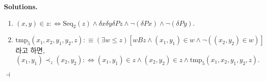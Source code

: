 \documentclass[12pt]{paper}
\newenvironment{context}[1][]
{ \noindent \textbf{{#1}.} }
{ \hfill $ \dashv $ }
\begin{document}
\begin{context}[Solutions]
\begin{enumerate}
\begin{enumerate}
\item $ \left( x , y \right) \in z : \iff \mathrm{Seq}_2 \left( z \right) \land \delta x \delta y \delta P z \land \lnot \left( \delta P x \right) \land \lnot \left( \delta P y \right) . $
\item $\mathrm{tmp}_5 \left( x_1 , x_2 , y_1 , y_2 , z \right) : \equiv \left( \exists w \le z \right) \left[ w B z \land \left( x_1 , y_1 \right) \in w \land \lnot \left( \left( x_2 , y_2 \right) \in w \right) \right] $라고 하면,
$$ \left( x_1 , y_1 \right) \prec_z \left( x_2 , y_2 \right) : \iff \left( x_1 , y_1 \right) \in z \land \left( x_2 , y_2 \right) \in z \land \mathrm{tmp}_5 \left( x_1 , x_2 , y_1 , y_2 , z \right) . $$
\end{enumerate}
\end{enumerate}
\end{context}
\end{document}
